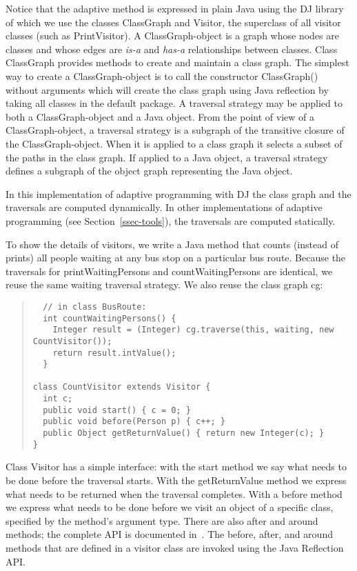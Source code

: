 Notice that the adaptive method is expressed in plain Java using the
DJ library of which we use the classes {\sf ClassGraph} and {\sf
Visitor}, the superclass of all visitor classes (such as {\sf
PrintVisitor}).  A {\sf ClassGraph}-object is a graph whose nodes are
classes and whose edges are \emph{is-a} and \emph{has-a} relationships
between classes. Class {\sf ClassGraph} provides methods to create and
maintain a class graph.  The simplest way to create a {\sf
ClassGraph}-object is to call the constructor {\sf ClassGraph()}
without arguments which will create the class graph using Java
reflection by taking all classes in the default package.  A traversal
strategy may be applied to both a {\sf ClassGraph}-object and a
Java object.  From the point of view of a {\sf ClassGraph}-object, a
traversal strategy is a subgraph of the transitive closure of the
{\sf ClassGraph}-object.  When it is applied to a class graph it
selects a subset of the paths in the class graph.  If applied to a
Java object, a traversal strategy defines a subgraph of the
object graph representing the Java object.

In this implementation of adaptive programming with DJ the class graph
and the traversals are computed dynamically.  In other implementations
of adaptive programming (see Section~\ref{ssec-tools}), the traversals
are computed statically.

To show the details of visitors, we write a Java method that counts
(instead of prints) all people waiting at any bus stop on a particular
bus route. Because the traversals for {\sf printWaitingPersons} and
{\sf countWaitingPersons} are identical, we reuse the same {\sf
waiting} traversal strategy.  We also reuse the class graph
{\sf cg}:
\begin{quote}
\begin{verbatim}
  // in class BusRoute:
  int countWaitingPersons() {
    Integer result = (Integer) cg.traverse(this, waiting, new CountVisitor());
    return result.intValue();
  }

class CountVisitor extends Visitor {
  int c;
  public void start() { c = 0; }
  public void before(Person p) { c++; }
  public Object getReturnValue() { return new Integer(c); } 
}
\end{verbatim}
\end{quote}
Class {\sf Visitor} has a simple interface: with the {\sf start}
method we say what needs to be done before the traversal starts.  With
the {\sf getReturnValue} method we express what needs to be returned
when the traversal completes. With a {\sf before} method we express
what needs to be done before we visit an object of a specific class,
specified by the method's argument type.  There are also {\sf after}
and {\sf around} methods; the complete API is documented
in~\cite{URL:demeter}.  The {\sf before}, {\sf after}, and {\sf around}
methods that are defined in a visitor class are invoked using the Java
Reflection API.

